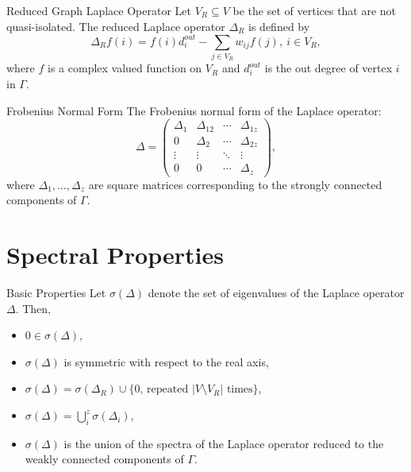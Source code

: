 \documentclass{beamer}
\newcommand\abs[1]{\left|#1\right|}
\begin{document}
\begin{frame}{Reduced Graph Laplace Operator}
Let $V_{R}\subseteq V$ be the set of vertices that are not quasi-isolated.
The reduced Laplace operator $\Delta_{R}$ is defined by
\vfill
\[
\Delta_{R}f(i)=f(i)d_{i}^{out} - \sum_{j\in V_{R}}w_{ij}f(j),~i\in V_{R},
\]
\vfill
where $f$ is a complex valued function on $V_{R}$ and $d_{i}^{out}$ is the out degree of vertex $i$ in $\Gamma$.
\vfill
\end{frame}

\begin{frame}{Frobenius Normal Form}
The Frobenius normal form of the Laplace operator:
\vfill
\[
\Delta = 	\left(\begin{array}{cccc}
		\Delta_{1} & \Delta_{12} & \cdots & \Delta_{1z} \\
		0 & \Delta_{2} & \cdots & \Delta_{2z} \\
		\vdots & \vdots & \ddots & \vdots \\
		0 & 0 & \cdots & \Delta_{z}
		\end{array}\right),
\]
\vfill
where $\Delta_{1},\ldots,\Delta_{z}$ are square matrices corresponding to the strongly connected components of $\Gamma$.
\vfill
\end{frame}

\section{Spectral Properties}

\begin{frame}{Basic Properties}
Let $\sigma(\Delta)$ denote the set of eigenvalues of the Laplace operator $\Delta$. 
Then,
\vfill
\begin{itemize}
\item	$0\in\sigma(\Delta)$,
\vfill
\item $\sigma(\Delta)$ is symmetric with respect to the real axis,
\vfill
\item $\sigma(\Delta)=\sigma(\Delta_{R})\cup\{\text{$0$, repeated $\abs{V\setminus{V_{R}}}$ times}\}$,
\vfill
\item	$\sigma(\Delta)=\bigcup_{i}^{z}\sigma(\Delta_{i})$,
\vfill
\item	$\sigma(\Delta)$ is the union of the spectra of the Laplace operator reduced to the weakly connected components of $\Gamma$.
\end{itemize}
\vfill
\end{frame}
\end{document}
